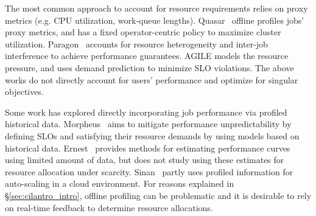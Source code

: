 The most common approach to account for resource requirements relies on proxy metrics (e.g. CPU utilization, work-queue lengths).
Quasar~\cite{delimitrou2014quasar} 
offline profiles jobs' proxy metrics,
and has a fixed operator-centric policy to maximize cluster
utilization.
Paragon~\cite{delimitrou2013paragon} accounts for resource heterogeneity and inter-job interference
 to achieve performance guarantees.
AGILE\cite{nguyen2013AGILEED} models the resource pressure, and uses demand prediction to minimize SLO violations.
The above works do not directly account for users' performance  and optimize for singular objectives.


% 

Some work has explored directly incorporating job performance
via profiled historical data.
Morpheus~\cite{morpheus} aims to mitigate performance unpredictability by
defining SLOs and satisfying their resource demands by using models based on historical data.
Ernest~\cite{venkataraman2016ernest} provides methods for estimating performance curves using
limited amount of data, but does not study using these estimates for
resource allocation under scarcity.
Sinan~\cite{zhang2021sinan} partly
uses profiled information for auto-scaling in a cloud environment.
For reasons explained in \S\ref{sec:cilantro_intro}, offline profiling can be problematic
and it is desirable to rely on real-time feedback to determine resource allocations.


